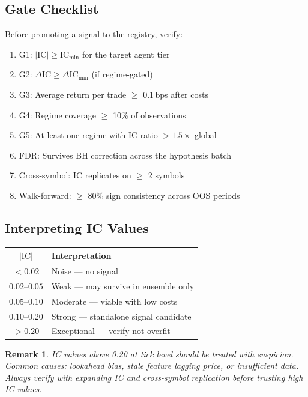 \documentclass[11pt,a4paper]{article}
\newcommand{\toprule}{\hline\hline}
\newcommand{\midrule}{\hline}
\newcommand{\bottomrule}{\hline\hline}
\newtheorem{remark}{Remark}
\begin{document}
\subsection{Gate Checklist}

Before promoting a signal to the registry, verify:

\begin{enumerate}    \item[$\square$] G1: $|\mathrm{IC}| \geq \mathrm{IC}_{\min}$ for the
        target agent tier
    \item[$\square$] G2: $\Delta\mathrm{IC} \geq \Delta\mathrm{IC}_{\min}$
        (if regime-gated)
    \item[$\square$] G3: Average return per trade $\geq$ 0.1\,bps after costs
    \item[$\square$] G4: Regime coverage $\geq$ 10\% of observations
    \item[$\square$] G5: At least one regime with IC ratio $> 1.5\times$ global
    \item[$\square$] FDR: Survives BH correction across the hypothesis batch
    \item[$\square$] Cross-symbol: IC replicates on $\geq$ 2 symbols
    \item[$\square$] Walk-forward: $\geq$ 80\% sign consistency across OOS periods
\end{enumerate}

\subsection{Interpreting IC Values}

\begin{center}
\begin{tabular}{cl}
    \toprule
    $|\mathrm{IC}|$ & \textbf{Interpretation} \\
    \midrule
    $< 0.02$ & Noise --- no signal \\
    $0.02$--$0.05$ & Weak --- may survive in ensemble only \\
    $0.05$--$0.10$ & Moderate --- viable with low costs \\
    $0.10$--$0.20$ & Strong --- standalone signal candidate \\
    $> 0.20$ & Exceptional --- verify not overfit \\
    \bottomrule
\end{tabular}
\end{center}

\begin{remark}
IC values above 0.20 at tick level should be treated with suspicion.
Common causes: lookahead bias, stale feature lagging price, or
insufficient data. Always verify with expanding IC and cross-symbol
replication before trusting high IC values.
\end{remark}
\end{document}
